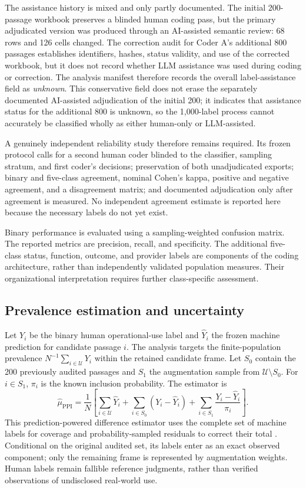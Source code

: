 \documentclass[12pt]{article}
\begin{document}
The assistance history is mixed and only partly documented. The initial
200-passage workbook preserves a blinded human coding pass, but the primary
adjudicated version was produced through an AI-assisted semantic review:
68 rows and 126 cells changed. The correction audit for Coder A's additional
800 passages establishes identifiers, hashes, status validity, and use of the
corrected workbook, but it does not record whether LLM assistance was used
during coding or correction. The analysis manifest therefore records the
overall label-assistance field as \emph{unknown}. This conservative field does
not erase the separately documented AI-assisted adjudication of the initial
200; it indicates that assistance status for the additional 800 is unknown,
so the 1,000-label process cannot accurately be classified wholly as either
human-only or LLM-assisted.

A genuinely independent reliability study therefore remains required. Its
frozen protocol calls for a second human coder blinded to the classifier,
sampling stratum, and first coder's decisions; preservation of both
unadjudicated exports; binary and five-class agreement, nominal Cohen's
kappa, positive and negative agreement, and a disagreement matrix; and
documented adjudication only after agreement is measured. No independent
agreement estimate is reported here because the necessary labels do not yet
exist.


Binary performance is evaluated using a sampling-weighted confusion matrix.
The reported metrics are precision, recall, and specificity. The additional
five-class status, function, outcome, and provider labels are components of
the coding architecture, rather than independently validated population
measures. Their organizational interpretation requires further class-specific
assessment.

\subsection{Prevalence estimation and uncertainty}
\label{sec:estimation}

Let $Y_i$ be the binary human operational-use label and $\widehat Y_i$ the
frozen machine prediction for candidate passage $i$. The analysis targets the
finite-population prevalence $N^{-1}\sum_{i\in\mathcal U}Y_i$ within the
retained candidate frame. Let $S_0$ contain the 200 previously audited passages
and $S_1$ the augmentation sample from $\mathcal U\setminus S_0$. For
$i\in S_1$, $\pi_i$ is the known inclusion probability. The estimator is
\[
\widehat\mu_{\mathrm{PPI}}
=\frac{1}{N}\left[
\sum_{i\in\mathcal U}\widehat Y_i
+\sum_{i\in S_0}(Y_i-\widehat Y_i)
+\sum_{i\in S_1}\frac{Y_i-\widehat Y_i}{\pi_i}\right].
\]
This prediction-powered difference estimator uses the complete set of machine
labels for coverage and probability-sampled residuals to correct their total
\citep{angelopoulos2023ppi}. Conditional on the original audited set,
its labels enter as an exact observed component; only the remaining frame is
represented by augmentation weights. Human labels remain fallible reference
judgments, rather than verified observations of undisclosed real-world use.
\end{document}
